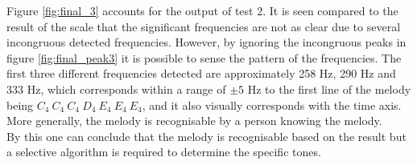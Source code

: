 Figure \ref{fig:final_3} accounts for the output of test 2. It is seen compared to the result of the scale that the significant frequencies are not as clear due to several incongruous detected frequencies. However, by ignoring the incongruous peaks in figure \ref{fig:final_peak3} it is possible to sense the pattern of the frequencies. The first three different frequencies detected are approximately 258 Hz, 290 Hz and 333 Hz, which corresponds within a range of $\pm 5$ Hz to the first line of the melody being $C_4 \ C_4 \ C_4 \ D_4 \ E_4 \ E_4 \ E_4$, and it also visually corresponds with the time axis. More generally, the melody is recognisable by a person knowing the melody. \\
By this one can conclude that the melody is recognisable based on the result but a selective algorithm is required to determine the specific tones.                  

